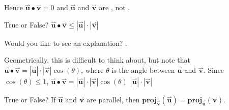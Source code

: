 \documentclass{ximera}
\begin{document}
\begin{exercise}
\begin{selectAll}
\begin{hint}
\begin{problem}
\begin{question}
\begin{itemize}
Hence $\overset{\boldsymbol{\rightharpoonup}}{\mathbf{u}} \bullet \overset{\boldsymbol{\rightharpoonup}}{\mathbf{v}} = 0$ and $\overset{\boldsymbol{\rightharpoonup}}{\mathbf{u}}$ and $\overset{\boldsymbol{\rightharpoonup}}{\mathbf{v}}$ are , not .
\end{itemize}
\end{question}
\end{problem}
\begin{problem}
True or False?  $\overset{\boldsymbol{\rightharpoonup}}{\mathbf{u}} \bullet \overset{\boldsymbol{\rightharpoonup}}{\mathbf{v}} \leq |\overset{\boldsymbol{\rightharpoonup}}{\mathbf{u}}| \cdot |\overset{\boldsymbol{\rightharpoonup}}{\mathbf{v}}|$

Would you like to see an explanation?
.

\begin{question}
\begin{itemize}
Geometrically, this is difficult to think about, but note that $\overset{\boldsymbol{\rightharpoonup}}{\mathbf{u}} \bullet \overset{\boldsymbol{\rightharpoonup}}{\mathbf{v}} =  |\overset{\boldsymbol{\rightharpoonup}}{\mathbf{u}}| \cdot |\overset{\boldsymbol{\rightharpoonup}}{\mathbf{v}}| \cos(\theta)$, where $\theta$ is the angle between $\overset{\boldsymbol{\rightharpoonup}}{\mathbf{u}}$ and $\overset{\boldsymbol{\rightharpoonup}}{\mathbf{v}}$.  Since $\cos(\theta) \leq 1$, $\overset{\boldsymbol{\rightharpoonup}}{\mathbf{u}} \bullet \overset{\boldsymbol{\rightharpoonup}}{\mathbf{v}} =  |\overset{\boldsymbol{\rightharpoonup}}{\mathbf{u}}| \cdot |\overset{\boldsymbol{\rightharpoonup}}{\mathbf{v}}| \cos(\theta)$ \wordChoice{\choice[correct]{$\leq$}\choice{$\geq$}} $|\overset{\boldsymbol{\rightharpoonup}}{\mathbf{u}}| \cdot |\overset{\boldsymbol{\rightharpoonup}}{\mathbf{v}}|$
\end{itemize}
\end{question}
\end{problem}
\begin{problem}
True or False?  If $\overset{\boldsymbol{\rightharpoonup}}{\mathbf{u}}$ and $\overset{\boldsymbol{\rightharpoonup}}{\mathbf{v}}$ are parallel, then $\mathbf{proj}_{\overset{\boldsymbol{\rightharpoonup}}{\mathbf{v}}}(\overset{\boldsymbol{\rightharpoonup}}{\mathbf{u}}) = \mathbf{proj}_{\overset{\boldsymbol{\rightharpoonup}}{\mathbf{u}}}(\overset{\boldsymbol{\rightharpoonup}}{\mathbf{v}})$.


\end{problem}
\end{hint}
\end{selectAll}
\end{exercise}
\end{document}
